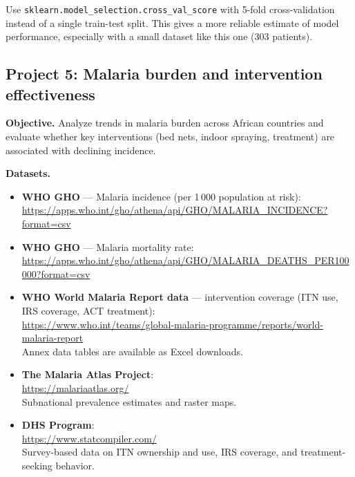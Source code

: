 \begin{pythontip}
Use \texttt{sklearn.model\_selection.cross\_val\_score} with 5-fold cross-validation instead of a single train-test split. This gives a more reliable estimate of model performance, especially with a small dataset like this one (303 patients).
\end{pythontip}

\subsection{Project 5: Malaria burden and intervention effectiveness}

\textbf{Objective.} Analyze trends in malaria burden across African countries and evaluate whether key interventions (bed nets, indoor spraying, treatment) are associated with declining incidence.

\textbf{Datasets.}
\begin{itemize}
  \item \textbf{WHO GHO} --- Malaria incidence (per 1\,000 population at risk):\\
  \url{https://apps.who.int/gho/athena/api/GHO/MALARIA_INCIDENCE?format=csv}
  \item \textbf{WHO GHO} --- Malaria mortality rate:\\
  \url{https://apps.who.int/gho/athena/api/GHO/MALARIA_DEATHS_PER100000?format=csv}
  \item \textbf{WHO World Malaria Report data} --- intervention coverage (ITN use, IRS coverage, ACT treatment):\\
  \url{https://www.who.int/teams/global-malaria-programme/reports/world-malaria-report}\\
  Annex data tables are available as Excel downloads.
  \item \textbf{The Malaria Atlas Project}:\\
  \url{https://malariaatlas.org/}\\
  Subnational prevalence estimates and raster maps.
  \item \textbf{DHS Program}:\\
  \url{https://www.statcompiler.com/}\\
  Survey-based data on ITN ownership and use, IRS coverage, and treatment-seeking behavior.
\end{itemize}

